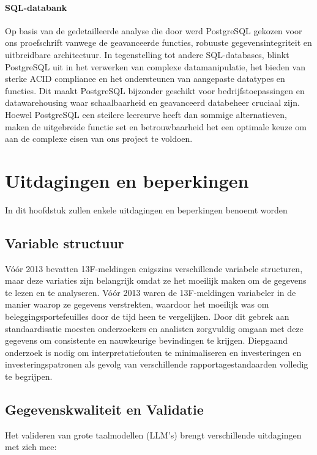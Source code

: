 \paragraph{SQL-databank}
Op basis van de gedetailleerde analyse die door \autocite{Javija2024} werd PostgreSQL gekozen voor ons proefschrift vanwege de geavanceerde functies, robuuste gegevensintegriteit en uitbreidbare architectuur. In tegenstelling tot andere SQL-databases, blinkt PostgreSQL uit in het verwerken van complexe datamanipulatie, het bieden van sterke ACID compliance en het ondersteunen van aangepaste datatypes en functies. Dit maakt PostgreSQL bijzonder geschikt voor bedrijfstoepassingen en datawarehousing waar schaalbaarheid en geavanceerd databeheer cruciaal zijn. Hoewel PostgreSQL een steilere leercurve heeft dan sommige alternatieven, maken de uitgebreide functie set en betrouwbaarheid het een optimale keuze om aan de complexe eisen van ons project te voldoen.



\section{Uitdagingen en beperkingen}
In dit hoofdstuk zullen enkele uitdagingen en beperkingen benoemt worden
\subsection{Variable structuur}
Vóór 2013 bevatten 13F-meldingen enigszins verschillende variabele structuren, maar deze variaties zijn belangrijk omdat ze het moeilijk maken om de gegevens te lezen en te analyseren. Vóór 2013 waren de 13F-meldingen variabeler in de manier waarop ze gegevens verstrekten, waardoor het moeilijk was om beleggingsportefeuilles door de tijd heen te vergelijken. Door dit gebrek aan standaardisatie moesten onderzoekers en analisten zorgvuldig omgaan met deze gegevens om consistente en nauwkeurige bevindingen te krijgen. Diepgaand onderzoek is nodig om interpretatiefouten te minimaliseren en investeringen en investeringspatronen als gevolg van verschillende rapportagestandaarden volledig te begrijpen.
\subsection{Gegevenskwaliteit en Validatie}
Het valideren van grote taalmodellen (LLM's) brengt verschillende uitdagingen met zich mee:

